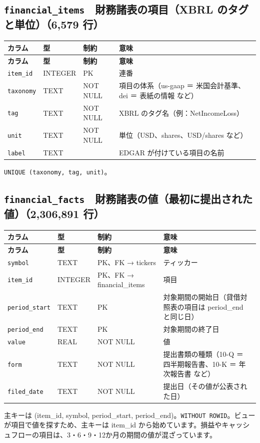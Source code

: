 \documentclass[xelatex,ja=standard,jafont=hiragino-pron,a4paper,10pt]{bxjsreport}
\begin{document}
\subsection*{\texttt{financial\_\allowbreak{}items}　財務諸表の項目（XBRL のタグと単位）（6,579 行）}
{\footnotesize
\begin{longtable}{p{3.30cm}p{1.40cm}p{3.00cm}p{6.40cm}}
\toprule
\textbf{カラム} & \textbf{型} & \textbf{制約} & \textbf{意味} \\
\midrule
\endfirsthead
\toprule
\textbf{カラム} & \textbf{型} & \textbf{制約} & \textbf{意味} \\
\midrule
\endhead
\bottomrule
\endfoot
\texttt{item\_\allowbreak{}id} & INTEGER & PK & 連番 \\
\texttt{taxonomy} & TEXT & NOT NULL & 項目の体系（us-gaap ＝ 米国会計基準、dei ＝ 表紙の情報 など） \\
\texttt{tag} & TEXT & NOT NULL & XBRL のタグ名（例：NetIncomeLoss） \\
\texttt{unit} & TEXT & NOT NULL & 単位（USD、shares、USD/shares など） \\
\texttt{label} & TEXT &  & EDGAR が付けている項目の名前 \\
\end{longtable}
}
{\small \texttt{UNIQUE (taxonomy, tag, unit)}。\par}
\medskip
\subsection*{\texttt{financial\_\allowbreak{}facts}　財務諸表の値（最初に提出された値）（2,306,891 行）}
{\footnotesize
\begin{longtable}{p{3.30cm}p{1.40cm}p{3.00cm}p{6.40cm}}
\toprule
\textbf{カラム} & \textbf{型} & \textbf{制約} & \textbf{意味} \\
\midrule
\endfirsthead
\toprule
\textbf{カラム} & \textbf{型} & \textbf{制約} & \textbf{意味} \\
\midrule
\endhead
\bottomrule
\endfoot
\texttt{symbol} & TEXT & PK、FK → tickers & ティッカー \\
\texttt{item\_\allowbreak{}id} & INTEGER & PK、FK → financial\_items & 項目 \\
\texttt{period\_\allowbreak{}start} & TEXT & PK & 対象期間の開始日（貸借対照表の項目は period\_end と同じ日） \\
\texttt{period\_\allowbreak{}end} & TEXT & PK & 対象期間の終了日 \\
\texttt{value} & REAL & NOT NULL & 値 \\
\texttt{form} & TEXT & NOT NULL & 提出書類の種類（10-Q ＝ 四半期報告書、10-K ＝ 年次報告書 など） \\
\texttt{filed\_\allowbreak{}date} & TEXT & NOT NULL & 提出日（その値が公表された日） \\
\end{longtable}
}
{\small 主キーは (item\_id, symbol, period\_start, period\_end)。\texttt{WITHOUT ROWID}。ビューが項目で値を探すため、主キーは item\_id から始めています。損益やキャッシュフローの項目は、3・6・9・12か月の期間の値が混ざっています。\par}
\medskip
\end{document}
